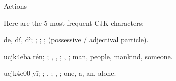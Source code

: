 




\vspace{\myLineheight}\begin{multicols}{2}\raggedcolumns{}

\end{multicols}


{\mktsHTwo{}Actions\mktsHTwoBeg}%


\vspace{\myLineheight}\begin{multicols}{2}\raggedcolumns{}Here are the 5 most frequent CJK characters:

\cjkgGlue{}\cjkgGlue{}\cjkgGlue{}\cjkgGlue{}\cjkgGlue{}

{ de, dí, dì; \cjkgGlue{}; \cjkgGlue{}; \cjkgGlue{}; {\mktsStyleGloss{}(possessive / adjectival particle)}.

{\mktsStyleMidashi{}\cjkgGlue{}}{\mktsStyleFncr{}u\cjkgGlue{}cjk\cjkgGlue{}4eba} rén; \cjkgGlue{}; \cjkgGlue{}, \cjkgGlue{}, \cjkgGlue{}; \cjkgGlue{}, \cjkgGlue{}; {\mktsStyleGloss{}man, people, mankind, someone}.

{\mktsStyleMidashi{}\cjkgGlue{}}{\mktsStyleFncr{}u\cjkgGlue{}cjk\cjkgGlue{}4e00} yī; \cjkgGlue{}; \cjkgGlue{}, \cjkgGlue{}\cjkgGlue{}\cjkgGlue{}; \cjkgGlue{}, \cjkgGlue{}; {\mktsStyleGloss{}one, a, an, alone}.

}
\end{multicols}
